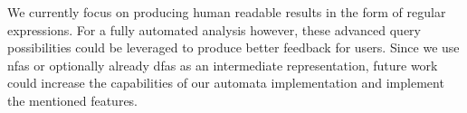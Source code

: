 We currently focus on producing human readable results in the form of regular expressions. For a fully automated analysis however, these advanced query possibilities could be leveraged to produce better feedback for users.
Since we use \acp{nfa} or optionally already \acp{dfa} as an intermediate representation, future work could increase the capabilities of our automata implementation and implement the mentioned features.

\begin{comment}
\begin{itemize}
\item How did you test/evaluate your PoC?
    \begin{itemize}
    \item E.g. case studies, large-scale studies, test bench, etc.
    \item What did you do to verify results (if applicable)
    \end{itemize}
\item What did you learn from these tests? Depends on your work. E.g.
    \begin{itemize}
    \item TP/TN/FP/FN rates
    \item Performance
    \item Results of your studies
    \item Interpretation of the results, lessons learned
    \end{itemize}
\item Limitations of the approach and your implementation. Any ideas on how to fix them?
\end{itemize}

Probably 5-15 pages
\end{comment}